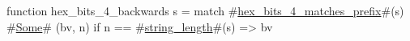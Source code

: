 function hex_bits_4_backwards s =
  match #\hyperref[sailRISCVzhexzybitszy4zymatcheszyprefix]{hex\_bits\_4\_matches\_prefix}#(s) {
      #\hyperref[sailRISCVzSome]{Some}# (bv, n) if n == #\hyperref[sailRISCVzstringzylength]{string\_length}#(s) => bv
  }
